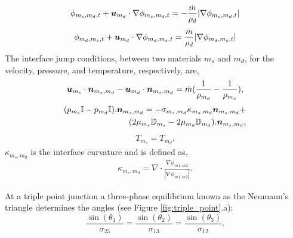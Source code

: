 \documentclass[]{article}
\newcommand{\bmu}{\mbox{\boldmath $u$\unboldmath}}
\newcommand{\bmn}{\mbox{\boldmath $n$\unboldmath}}
\newcommand{\DefTen}{\mathbb{D}}
\newcommand{\EyeTen}{\mathbb{I}}
\begin{document}
\begin{itemize}
\begin{eqnarray}
\phi_{m_{s},m_{d},t} + 
\bmu_{m_{d}}\cdot\nabla\phi_{m_{s},m_{d},t} =
-\frac{\dot{m}}{\rho_{d}}|\nabla\phi_{m_{s},m_{d},t}|
\end{eqnarray}
\begin{eqnarray}
\phi_{m_{d},m_{s},t} + 
\bmu_{m_{d}}\cdot\nabla\phi_{m_{d},m_{s},t} =
\frac{\dot{m}}{\rho_{d}}|\nabla\phi_{m_{d},m_{s},t}|
\end{eqnarray}
The interface jump conditions,
between two materials $m_{s}$ and $m_{d}$,
for the velocity, pressure, 
and temperature, respectively, are,
\begin{eqnarray*}
 \bmu_{m_{s}}\cdot \bmn_{m_{s},m_{d}}-
 \bmu_{m_{d}}\cdot \bmn_{m_{s},m_{d}} = 
\dot{m}(\frac{1}{\rho_{m_{d}}}-
	\frac{1}{\rho_{m_{s}}}),
\end{eqnarray*}
\begin{eqnarray*}
	(p_{m_{s}}\EyeTen-
	 p_{m_{d}}\EyeTen).\bmn_{m_{s},m_{d}}=
	-\sigma_{m_{s},m_{d}}\kappa_{m_{s},m_{d}}\bmn_{m_{s},m_{d}} + \\
	(2\mu_{m_{s}}\DefTen_{m_{s}}-
	 2\mu_{m_{d}}\DefTen_{m_{d}}).\bmn_{m_{s},m_{d}},
\end{eqnarray*}
\begin{eqnarray}
	T_{m_{s}}=
	T_{m_{d}}.
	\label{temperature_jump}
\end{eqnarray}
$\kappa_{m_{s},m_{d}}$ is the interface curvature
and is defined as,
\begin{eqnarray*}
	\kappa_{m_{s},m_{d}}=\nabla\cdot
	\frac{\nabla\phi_{m1,m2}}
             {|\nabla\phi_{m1,m2}|}.
\end{eqnarray*}

At a triple point junction a three-phase equilibrium known as the 
Neumann's triangle\cite{de2013capillarity} determines the 
angles (see Figure \ref{fig:triple_point}.a):
\begin{equation}
  \label{eq:triple_point_eqlib}
  \frac{\sin(\theta_{1})}{\sigma_{23}}=
  \frac{\sin(\theta_{2})}{\sigma_{13}}=
  \frac{\sin(\theta_{3})}{\sigma_{12}}.
\end{equation}

\end{itemize}
\end{document}
